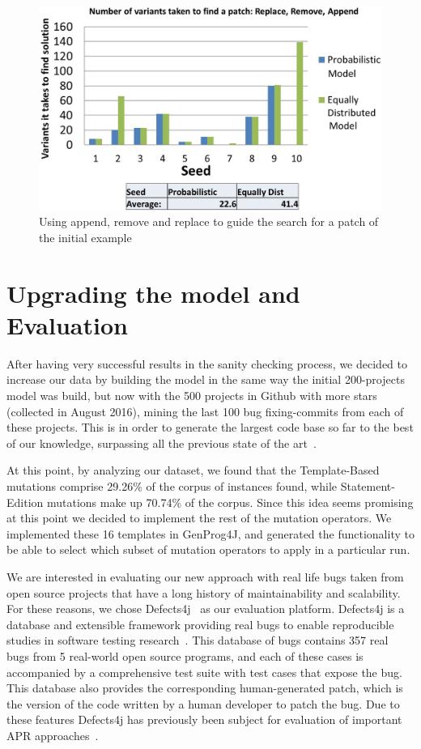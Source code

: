 \documentclass[conference]{IEEEtran}
\begin{document}
\begin{figure}[!h]
  \centering
    \includegraphics[scale=0.25]{sanity4}
  \caption{Using append, remove and replace to guide the search for a patch of 
the initial example}
  \label{fig:resultsARR}
\end{figure}

\section{Upgrading the model and Evaluation}
After having very successful results in the sanity checking process, we decided 
to increase our data by building the model in the same way the initial 200-projects model was build, but now with the 500 projects in Github with more 
stars (collected in August 2016), mining the last 100 bug fixing-commits from each of these projects. This is in order to generate the largest code base so far to the best 
of our knowledge, surpassing all the previous state of the 
art~\cite{long15,Soto15,zhong15,matias15,xuan16}. 

At this point, by analyzing our dataset, 
we found that the Template-Based mutations comprise 29.26\% of the corpus of 
instances found, while Statement-Edition mutations make up 70.74\% of the 
corpus. Since this idea seems promising at this point we decided to implement the rest 
of the mutation operators. We implemented these 16 templates in GenProg4J, and generated the functionality 
to be able to select which subset of mutation operators to apply in a particular 
run.

We are interested in evaluating our new approach with real life bugs taken from 
open source projects that have a long history of maintainability and 
scalability. For these reasons, we chose Defects4j~\cite{just14} as our 
evaluation platform. Defects4j is a database and extensible 
framework providing real bugs to enable reproducible studies in software testing 
research~\cite{just14}. This database of bugs contains 357 real bugs from 5 
real-world open source programs, and each of these cases is accompanied by a 
comprehensive test suite with test cases that expose the bug. This database also provides 
the corresponding human-generated patch, which is the version of the code written by a human 
developer to patch the bug. Due to these features Defects4j has previously been 
subject for evaluation of important APR approaches~\cite{Durieux15}.
\end{document}
